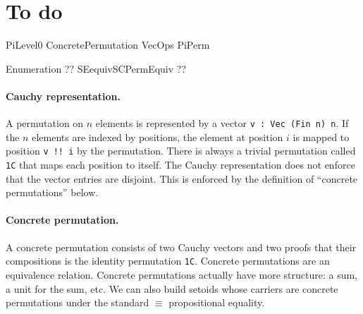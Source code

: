 \documentclass{article}
\begin{document}
\section{To do}

PiLevel0
ConcretePermutation
VecOps
PiPerm

Enumeration ??
SEequivSCPermEquiv ??

\paragraph*{Cauchy representation.} A permutation on $n$ elements is
represented by a vector \texttt{v : Vec (Fin n) n}. If the $n$
elements are indexed by positions, the element at position $i$ is
mapped to position \texttt{v !! i} by the permutation. There is always
a trivial permutation called \texttt{1C} that maps each position to
itself. The Cauchy representation does not enforce that the vector
entries are disjoint. This is enforced by the definition of ``concrete
permutations'' below.

\paragraph*{Concrete permutation.} A concrete permutation consists of
two Cauchy vectors and two proofs that their compositions is the
identity permutation \texttt{1C}. Concrete permutations are an
equivalence relation. Concrete permutations actually have more
structure: a sum, a unit for the sum, etc. We can also build setoids
whose carriers are concrete permutations under the standard $\equiv$
propositional equality.

\end{document}
